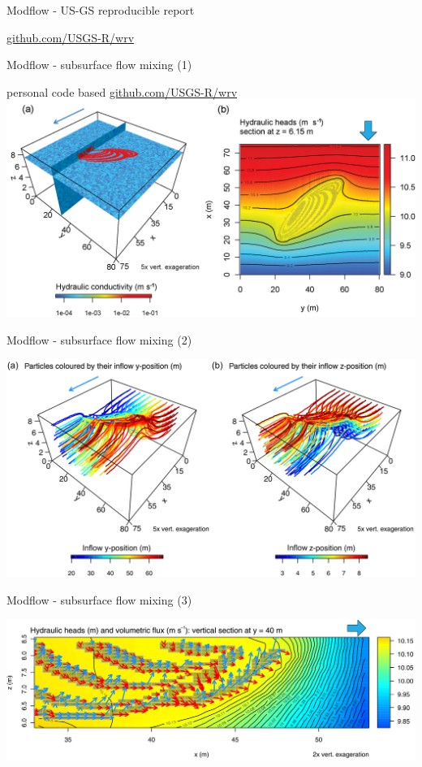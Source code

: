 \documentclass[9pt,ignorenonframetext,]{beamer}
\begin{document}
\begin{frame}{Modflow - US-GS reproducible report}

\href{https://github.com/USGS-R/wrv}{github.com/USGS-R/wrv}

\end{frame}

\begin{frame}{Modflow - subsurface flow mixing (1)}

personal code based
\href{https://github.com/USGS-R/wrv}{github.com/USGS-R/wrv}
\includegraphics{imgPres/RMODFLOW_head.png}

\end{frame}

\begin{frame}{Modflow - subsurface flow mixing (2)}

\includegraphics{imgPres/RMODFLOW_particles.png}

\end{frame}

\begin{frame}{Modflow - subsurface flow mixing (3)}

\includegraphics{imgPres/RMODFLOW_zoom.png}

\end{frame}
\end{document}
